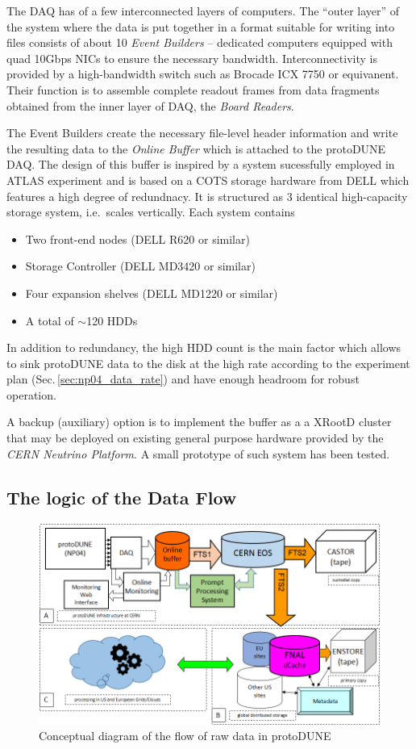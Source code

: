 \documentclass[a4paper]{jpconf}
\newcommand{\pd}{protoDUNE\xspace}
\begin{document}
The DAQ has of a few interconnected layers of computers.
The ``outer layer'' of the system where the data is put together in a format
suitable for writing into files consists of about 10
 \textit{Event Builders} -- dedicated computers equipped with quad 10Gbps NICs to ensure the necessary
bandwidth. Interconnectivity is provided by a high-bandwidth switch such as Brocade ICX 7750
or equivanent. Their function is to assemble complete readout frames from data
fragments obtained from the inner layer of DAQ, the \textit{Board Readers}.

The Event Builders create the necessary file-level header information and write the
resulting data  to the \textit{Online Buffer} which is attached to the \pd DAQ. 
The design of this buffer is inspired by a system sucessfully employed in ATLAS experiment
and is based on a COTS storage hardware from DELL which features a high degree of redundnacy.
It is structured as 3 identical high-capacity storage system, i.e.~scales vertically. Each system contains
\begin{itemize}

\item Two front-end nodes (DELL R620 or similar)
\item Storage Controller (DELL MD3420 or similar)
\item Four expansion shelves (DELL MD1220 or similar)
\item A total of $\sim$120 HDDs
\end{itemize}

\noindent In addition to redundancy, the high HDD count is the main factor which allows
to sink \pd data to the disk at the high rate according to the experiment plan (Sec.\,\ref{sec:np04_data_rate})
and have enough headroom for robust operation.


A backup (auxiliary) option is to implement the buffer as a a XRootD \cite{xrootd} cluster
that may be deployed on existing general purpose hardware provided by the \textit{CERN
Neutrino Platform}\cite{cenf}.
A small prototype of such system has been tested.


\subsection{The logic of the Data Flow}
\begin{figure}[tbh]
\centering\includegraphics[width=0.85\linewidth]{figures/protoDUNE_data_flow_2017_v1.png}
\caption{\label{fig:raw_concept}Conceptual diagram of the flow of raw data in \pd}
\end{figure}
\end{document}
